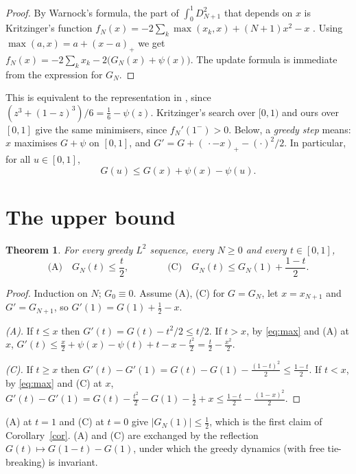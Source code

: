 \documentclass[11pt]{amsart}
\newtheorem{theorem}{Theorem}
\theoremstyle{remark}
\begin{document}
\begin{proof}
By Warnock's formula, the part of $\int_0^1 D_{N+1}^2$ that depends on $x$
is Kritzinger's function
$f_N(x)=-2\sum_k\max(x_k,x)+(N+1)x^2-x$ \cite{Kri}. Using
$\max(a,x)=a+(x-a)_+$ we get
$f_N(x)=-2\sum_k x_k-2\bigl(G_N(x)+\psi(x)\bigr)$. The update formula is
immediate from the expression for $G_N$.
\end{proof}

This is equivalent to the representation in \cite[\S\S2.2--2.3]{Ste}, since
$(z^3+(1-z)^3)/6=\tfrac16-\psi(z)$. Kritzinger's search over $[0,1)$ and ours
over $[0,1]$ give the same minimisers, since $f_N'(1^-)>0$. Below, a
\emph{greedy step} means: $x$ maximises $G+\psi$ on $[0,1]$, and
$G'=G+(\,\cdot-x)_+-(\cdot)^2/2$. In particular, for all $u\in[0,1]$,
\begin{equation}\label{eq:max}
G(u)\le G(x)+\psi(x)-\psi(u).
\end{equation}

\section{The upper bound}

\begin{theorem}\label{thm:upper}
For every greedy $L^2$ sequence, every $N\ge0$ and every $t\in[0,1]$,
\[
\text{(A)}\quad G_N(t)\le \frac t2,
\qquad\qquad
\text{(C)}\quad G_N(t)\le G_N(1)+\frac{1-t}{2}.
\]
\end{theorem}

\begin{proof}
Induction on $N$; $G_0\equiv0$. Assume (A), (C) for $G=G_N$, let $x=x_{N+1}$
and $G'=G_{N+1}$, so $G'(1)=G(1)+\tfrac12-x$.

\emph{(A).} If $t\le x$ then $G'(t)=G(t)-t^2/2\le t/2$. If $t>x$, by
\eqref{eq:max} and (A) at $x$,
$G'(t)\le \frac x2+\psi(x)-\psi(t)+t-x-\frac{t^2}{2}=\frac t2-\frac{x^2}{2}$.

\emph{(C).} If $t\ge x$ then
$G'(t)-G'(1)=G(t)-G(1)-\frac{(1-t)^2}{2}\le\frac{1-t}{2}$. If $t<x$, by
\eqref{eq:max} and (C) at $x$,
$G'(t)-G'(1)=G(t)-\frac{t^2}{2}-G(1)-\frac12+x\le\frac{1-t}{2}-\frac{(1-x)^2}{2}$.
\end{proof}

(A) at $t=1$ and (C) at $t=0$ give $|G_N(1)|\le\frac12$, which is the first
claim of Corollary~\ref{cor}. (A) and (C) are exchanged by the reflection
$G(t)\mapsto G(1-t)-G(1)$, under which the greedy dynamics (with free
tie-breaking) is invariant.
\end{document}
